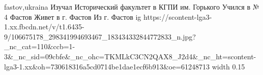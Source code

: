  
 
 
 
 

\par
fastov,ukraina
Изучал Исторический факультет в КГПИ им. Горького
Учился в № 4 Фастов
Живет в г. Фастов
Из г. Фастов
\ifcmt
  ig https://scontent-lga3-1.xx.fbcdn.net/v/t1.6435-9/106675178_298341994693467_183434332844772833_n.jpg?_nc_cat=110&ccb=1-3&_nc_sid=09cbfe&_nc_ohc=TKMLkC3CN2QAX8_J2d4&_nc_ht=scontent-lga3-1.xx&oh=730618316a5cd0714be1dae1ecf6b913&oe=61248713
  width 0.15
\fi

